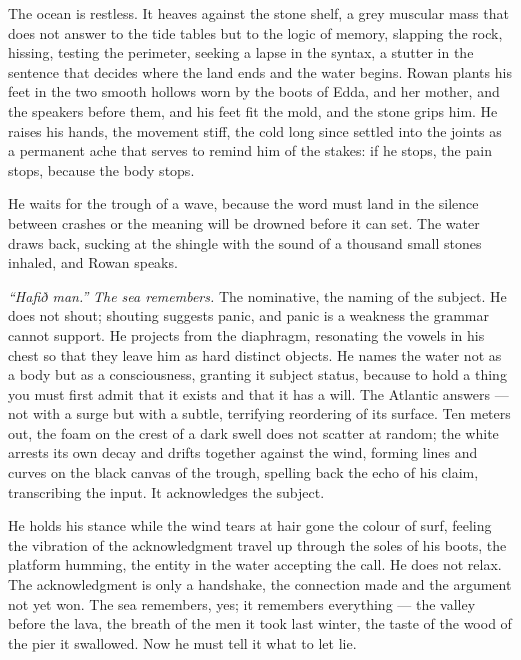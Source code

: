 \documentclass[11pt,oneside]{book}
\newcommand{\sceneline}{%
  \par\vspace{1.2em}
  \begin{center}
    \fontsize{11}{11}\selectfont \textbullet\quad\textbullet\quad\textbullet
  \end{center}
  \vspace{0.6em}\noindent\ignorespaces
}
\begin{document}
The ocean is restless. It heaves against the stone shelf, a grey
muscular mass that does not answer to the tide tables but to the logic
of memory, slapping the rock, hissing, testing the perimeter, seeking a
lapse in the syntax, a stutter in the sentence that decides where the
land ends and the water begins. Rowan plants his feet in the two smooth
hollows worn by the boots of Edda, and her mother, and the speakers
before them, and his feet fit the mold, and the stone grips him. He
raises his hands, the movement stiff, the cold long since settled into
the joints as a permanent ache that serves to remind him of the stakes:
if he stops, the pain stops, because the body stops.

He waits for the trough of a wave, because the word must land in the
silence between crashes or the meaning will be drowned before it can
set. The water draws back, sucking at the shingle with the sound of a
thousand small stones inhaled, and Rowan speaks.

\emph{``Hafið man.''} \emph{The sea remembers.} The nominative, the
naming of the subject. He does not shout; shouting suggests panic, and
panic is a weakness the grammar cannot support. He projects from the
diaphragm, resonating the vowels in his chest so that they leave him as
hard distinct objects. He names the water not as a body but as a
consciousness, granting it subject status, because to hold a thing you
must first admit that it exists and that it has a will. The Atlantic
answers --- not with a surge but with a subtle, terrifying reordering of
its surface. Ten meters out, the foam on the crest of a dark swell does
not scatter at random; the white arrests its own decay and drifts
together against the wind, forming lines and curves on the black canvas
of the trough, spelling back the echo of his claim, transcribing the
input. It acknowledges the subject.

He holds his stance while the wind tears at hair gone the colour of
surf, feeling the vibration of the acknowledgment travel up through the
soles of his boots, the platform humming, the entity in the water
accepting the call. He does not relax. The acknowledgment is only a
handshake, the connection made and the argument not yet won. The sea
remembers, yes; it remembers everything --- the valley before the lava,
the breath of the men it took last winter, the taste of the wood of the
pier it swallowed. Now he must tell it what to let lie.

\sceneline
\end{document}
